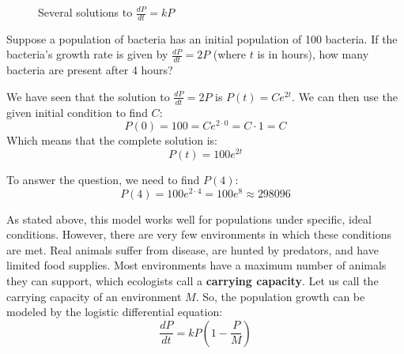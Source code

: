\begin{figure}[H]
\centering
    \caption{Several solutions to $\frac{dP}{dt} = kP$}
    \label{expdiff}
\end{figure}


\begin{Worked}
\begin{Problem}
Suppose a population of bacteria has an initial population
of 100 bacteria. If the bacteria's growth rate is given by $\frac{dP}{dt} = 
2P$ (where $t$ is in hours), how many bacteria are present after 4 hours?
\end{Problem}
\begin{Solution}
We have seen that the solution to $\frac{dP}{dt} = 2P$ is
$P(t) = Ce^{2t}$. We can then use the given initial condition to find $C$:
$$P(0) = 100 = Ce^{2 \cdot 0} = C \cdot 1 = C$$
Which means that the complete solution is:
$$P(t) = 100 e^{2t}$$

To answer the question, we need to find $P(4)$:
$$P(4) = 100 e^{2 \cdot 4} = 100 e^{8} \approx 298096$$
\end{Solution}
\end{Worked}

As stated above, this model works well for populations under specific, ideal 
conditions. However, there are very few environments in which these conditions 
are met. Real animals suffer from disease, are hunted by predators, and have 
limited food supplies. Most environments have a maximum number of animals they 
can support, which ecologists call a \textbf{carrying capacity}. Let us call the carrying capacity of an environment $M$. So, the 
population growth can be modeled by the logistic differential equation: 
$$\frac{dP}{dt} = kP \left( 1 - \frac{P}{M} \right)$$

